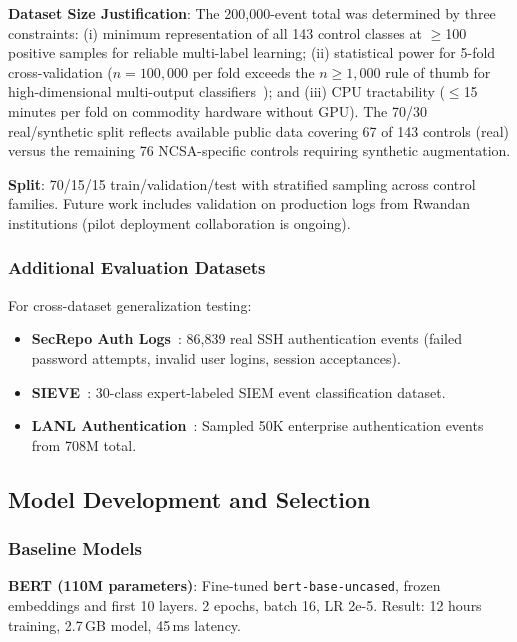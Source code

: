 \documentclass[futureinternet,article,submit,pdftex,moreauthors]{Definitions/mdpi}
\begin{document}
\textbf{Dataset Size Justification}: The 200{,}000-event total was determined by three
constraints: (i) minimum representation of all 143 control classes at $\geq$100 positive
samples for reliable multi-label learning; (ii) statistical power for 5-fold cross-validation
($n = 100{,}000$ per fold exceeds the $n \geq 1{,}000$ rule of thumb for high-dimensional
multi-output classifiers~\cite{tsoumakas2007}); and (iii) CPU tractability ($\leq$15 minutes
per fold on commodity hardware without GPU). The 70/30 real/synthetic split reflects available
public data covering 67 of 143 controls (real) versus the remaining 76 NCSA-specific controls
requiring synthetic augmentation.

\textbf{Split}: 70/15/15 train/validation/test with stratified sampling across control
families. Future work includes validation on production logs from Rwandan institutions
(pilot deployment collaboration is ongoing).

\subsubsection{Additional Evaluation Datasets}

For cross-dataset generalization testing:
\begin{itemize}
\item \textbf{SecRepo Auth Logs}~\cite{secrepo}: 86{,}839 real SSH authentication events
(failed password attempts, invalid user logins, session acceptances).
\item \textbf{SIEVE}~\cite{sieve_dataset}: 30-class expert-labeled SIEM event classification
dataset.
\item \textbf{LANL Authentication}~\cite{lanl_auth}: Sampled 50K enterprise authentication
events from 708M total.
\end{itemize}

\subsection{Model Development and Selection}

\subsubsection{Baseline Models}

\textbf{BERT (110M parameters)}: Fine-tuned \texttt{bert-base-uncased}, frozen embeddings
and first 10 layers. 2 epochs, batch 16, LR 2e-5. Result: 12 hours training, 2.7\,GB model,
45\,ms latency.
\end{document}

